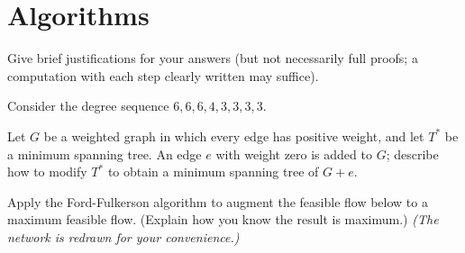 \documentclass[addpoints,10pt]{exam}
\newcounter{savedqn}
\begin{document}
\section*{Algorithms}
Give brief justifications for your answers (but not necessarily full proofs; a computation with each step clearly written may suffice).
\begin{questions}
\setcounter{question}{\thesavedqn}


\question Consider the degree sequence $6,6,6,4,3,3,3,3$.

\pagebreak

\question[10] Let $G$ be a weighted graph in which every edge has positive weight, and let $T^*$ be a minimum spanning tree.  An edge $e$ with weight zero is added to $G$; describe how to modify $T^*$ to obtain a minimum spanning tree of $G+e$.%

\pagebreak

\question[12] Apply the Ford-Fulkerson algorithm to augment the feasible flow below to a maximum feasible flow.  (Explain how you know the result is maximum.)  \textit{(The network is redrawn for your convenience.)}


\end{questions}
\end{document}
